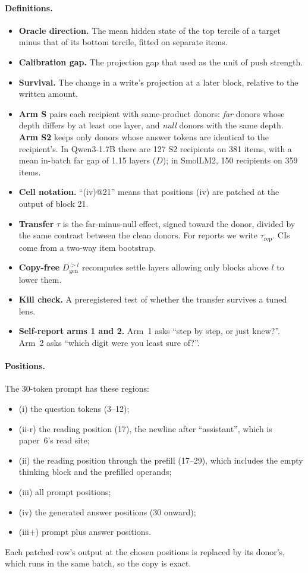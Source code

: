 \documentclass[11pt]{article}
\begin{document}
\paragraph{Definitions.}
\begin{itemize}
\item \textbf{Oracle direction.} The mean hidden state of the top tercile of a target minus that of its bottom tercile, fitted on separate items.
\item \textbf{Calibration gap.} The projection gap that \citet{ramdan2026battery} used as the unit of push strength.
\item \textbf{Survival.} The change in a write's projection at a later block, relative to the written amount.
\item \textbf{Arm S} pairs each recipient with same-product donors: \emph{far} donors whose depth differs by at least one layer, and \emph{null} donors with the same depth. \textbf{Arm S2} keeps only donors whose answer tokens are identical to the recipient's. In Qwen3-1.7B there are 127 S2 recipients on 381 items, with a mean in-batch far gap of 1.15 layers ($D$); in SmolLM2, 150 recipients on 359 items.
\item \textbf{Cell notation.} ``(iv)@21'' means that positions (iv) are patched at the output of block 21.
\item \textbf{Transfer} $\tau$ is the far-minus-null effect, signed toward the donor, divided by the same contrast between the clean donors. For reports we write $\tau_\text{rep}$. CIs come from a two-way item bootstrap.
\item \textbf{Copy-free} $D_\text{gen}^{>l}$ recomputes settle layers allowing only blocks above $l$ to lower them.
\item \textbf{Kill check.} A preregistered test of whether the transfer survives a tuned lens.
\item \textbf{Self-report arms 1 and 2.} Arm~1 asks ``step by step, or just knew?''. Arm~2 asks ``which digit were you least sure of?''.
\end{itemize}

\paragraph{Positions.} The 30-token prompt has these regions:
\begin{itemize}
\item (i) the question tokens (3--12);
\item (ii-r) the reading position (17), the newline after ``assistant'', which is paper~6's read site;
\item (ii) the reading position through the prefill (17--29), which includes the empty thinking block and the prefilled operands;
\item (iii) all prompt positions;
\item (iv) the generated answer positions (30 onward);
\item (iii$+$) prompt plus answer positions.
\end{itemize}
Each patched row's output at the chosen positions is replaced by its donor's, which runs in the same batch, so the copy is exact.
\end{document}
